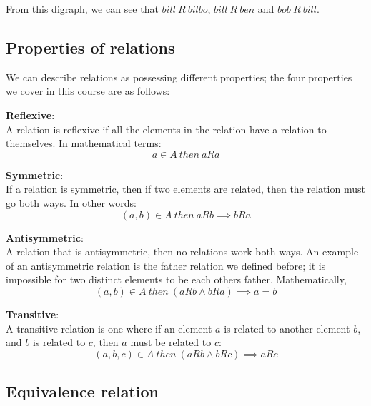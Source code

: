 From this digraph, we can see that $bill~R~bilbo$, $bill~R~ben$ and
$bob~R~bill$.

\subsection{Properties of relations}

We can describe relations as possessing different properties; the four properties
we cover in this course are as follows:

\begin{description}
	\item {\bf Reflexive}:\\
		A relation is reflexive if all the elements in the relation have a
		relation to themselves. In mathematical terms:
		\[
			a \in A~then~aRa
		\]
	\item {\bf Symmetric}:\\
		If a relation is symmetric, then if two elements are related, then the
		relation must go both ways. In other words:
		\[
			(a,b) \in A~then~aRb \implies bRa
		\]
	\item {\bf Antisymmetric}:\\
		A relation that is antisymmetric, then no relations work both ways. An
		example of an antisymmetric relation is the father relation we defined
		before; it is impossible for two distinct elements to be each others
		father. Mathematically, 
		\[
			(a,b) \in A~then~(aRb \wedge bRa) \implies a=b
		\]
	\item {\bf Transitive}:\\
		A transitive relation is one where if an element $a$ is related to
		another element $b$, and $b$ is related to $c$, then $a$ must be related
		to $c$:
		\[
			(a,b,c) \in A~then~(aRb \wedge bRc) \implies aRc
		\]
\end{description}

\subsection{Equivalence relation}